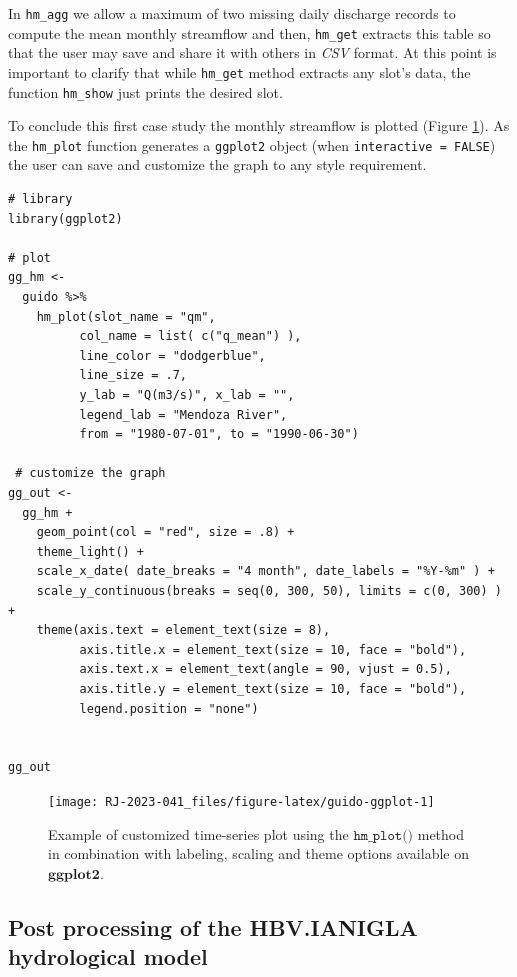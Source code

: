 \noindent
In \texttt{hm\_agg} we allow a maximum of two missing daily discharge records
to compute the mean monthly streamflow and then, \texttt{hm\_get} extracts this
table so that the user may save and share it with others in \emph{CSV} format.
At this point is important to clarify that while \texttt{hm\_get} method extracts
any slot's data, the function \texttt{hm\_show} just prints the desired slot.

To conclude this first case study the monthly streamflow is
plotted (Figure \ref{fig:guido-ggplot}). As the \texttt{hm\_plot}
function generates a \texttt{ggplot2} object (when \texttt{interactive\ =\ FALSE})
the user can save and customize the graph to any style requirement.

\begin{verbatim}
# library
library(ggplot2)

# plot
gg_hm <-
  guido %>%
    hm_plot(slot_name = "qm", 
          col_name = list( c("q_mean") ), 
          line_color = "dodgerblue",
          line_size = .7,
          y_lab = "Q(m3/s)", x_lab = "", 
          legend_lab = "Mendoza River", 
          from = "1980-07-01", to = "1990-06-30") 
  
 # customize the graph
gg_out <- 
  gg_hm + 
    geom_point(col = "red", size = .8) +
    theme_light() + 
    scale_x_date( date_breaks = "4 month", date_labels = "%Y-%m" ) +
    scale_y_continuous(breaks = seq(0, 300, 50), limits = c(0, 300) ) +
    theme(axis.text = element_text(size = 8),
          axis.title.x = element_text(size = 10, face = "bold"),
          axis.text.x = element_text(angle = 90, vjust = 0.5),
          axis.title.y = element_text(size = 10, face = "bold"), 
          legend.position = "none")
        

gg_out
\end{verbatim}

\begin{figure}

{\centering \texttt{[image: RJ-2023-041\_files/figure-latex/guido-ggplot-1]} 

}

\caption{Example of customized time-series plot using the $\texttt{hm\_plot()}$ method in combination with labeling, scaling and theme options available on $\textbf{ggplot2}$.}\label{fig:guido-ggplot}
\end{figure}

\hypertarget{post-processing-of-the-hbv.ianigla-hydrological-model}{%
\subsection{Post processing of the HBV.IANIGLA hydrological model}\label{post-processing-of-the-hbv.ianigla-hydrological-model}}

